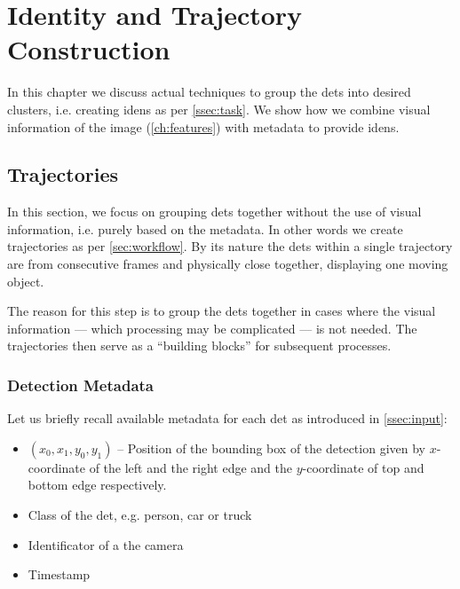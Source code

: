 \chapter{Identity and Trajectory Construction}

\label{ch:iden_construction}


In this chapter we discuss actual techniques to group the \glspl{det} into
desired clusters, i.e. creating \glspl{iden} as per \autoref{ssec:task}.
We show how we combine visual information of the image
(\autoref{ch:features}) with metadata to provide \glspl{iden}.

\section{Trajectories}

In this section, we focus on grouping \glspl{det} together without the use of visual information, i.e. purely based on the metadata. In other words we create trajectories as per \autoref{sec:workflow}. By its nature the \glspl{det} within a single trajectory are from consecutive frames and physically close together, displaying one moving object.

The reason for this step is to group the \glspl{det} together in cases
where the visual information --- which processing may be complicated --- is not
needed. The trajectories then serve as a ``building blocks'' for subsequent
processes.



\subsection{Detection Metadata}

Let us briefly recall available metadata for each \gls{det} as introduced in
\autoref{ssec:input}:

\begin{itemize}
    \item $(x_0, x_1, y_0, y_1)$ -- Position of the bounding box of the detection given by $x$-coordinate of the left and the right edge and the $y$-coordinate of top and bottom edge respectively.
    \item Class of the \gls{det}, e.g. person, car or truck
    \item Identificator of a the camera
    \item Timestamp
\end{itemize}

